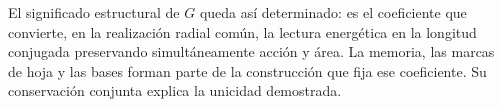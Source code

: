 El significado estructural de $G$ queda así determinado: es el coeficiente
que convierte, en la realización radial común, la lectura energética en
la longitud conjugada preservando simultáneamente acción y área.
La memoria, las marcas de hoja y las bases forman parte de la construcción
que fija ese coeficiente. Su conservación conjunta explica la unicidad
demostrada.
